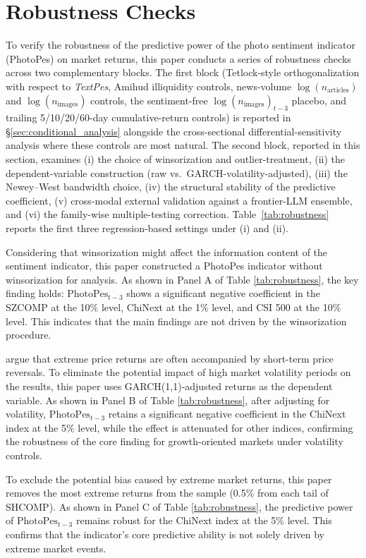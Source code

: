 \documentclass[AER]{AEA}
\begin{document}
\section{Robustness Checks}
To verify the robustness of the predictive power of the photo sentiment indicator (PhotoPes) on market returns, this paper conducts a series of robustness checks across two complementary blocks. The first block (Tetlock-style orthogonalization with respect to \textit{TextPes}, Amihud illiquidity controls, news-volume $\log(n_{\text{articles}})$ and $\log(n_{\text{images}})$ controls, the sentiment-free $\log(n_{\text{images}})_{t-3}$ placebo, and trailing 5/10/20/60-day cumulative-return controls) is reported in \S\ref{sec:conditional_analysis} alongside the cross-sectional differential-sensitivity analysis where these controls are most natural. The second block, reported in this section, examines (i) the choice of winsorization and outlier-treatment, (ii) the dependent-variable construction (raw vs.\ GARCH-volatility-adjusted), (iii) the Newey--West bandwidth choice, (iv) the structural stability of the predictive coefficient, (v) cross-modal external validation against a frontier-LLM ensemble, and (vi) the family-wise multiple-testing correction. Table~\ref{tab:robustness} reports the first three regression-based settings under (i) and (ii).

Considering that winsorization might affect the information content of the sentiment indicator, this paper constructed a PhotoPes indicator without winsorization for analysis. As shown in Panel A of Table \ref{tab:robustness}, the key finding holds: $\text{PhotoPes}_{t-3}$ shows a significant negative coefficient in the SZCOMP at the 10\% level, ChiNext at the 1\% level, and CSI 500 at the 10\% level. This indicates that the main findings are not driven by the winsorization procedure.

\citet{cox1994stock} argue that extreme price returns are often accompanied by short-term price reversals. To eliminate the potential impact of high market volatility periods on the results, this paper uses GARCH(1,1)-adjusted returns as the dependent variable. As shown in Panel B of Table \ref{tab:robustness}, after adjusting for volatility, $\text{PhotoPes}_{t-3}$ retains a significant negative coefficient in the ChiNext index at the 5\% level, while the effect is attenuated for other indices, confirming the robustness of the core finding for growth-oriented markets under volatility controls.

To exclude the potential bias caused by extreme market returns, this paper removes the most extreme returns from the sample (0.5\% from each tail of SHCOMP). As shown in Panel C of Table \ref{tab:robustness}, the predictive power of $\text{PhotoPes}_{t-3}$ remains robust for the ChiNext index at the 5\% level. This confirms that the indicator's core predictive ability is not solely driven by extreme market events.
\end{document}
